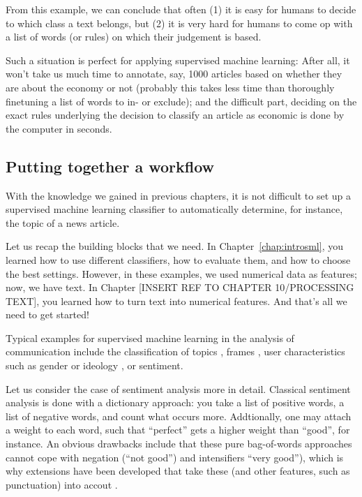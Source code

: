From this example, we can conclude that often (1) it is easy for
humans to decide to which class a text belongs, but (2) it is very
hard for humans to come op with a list of words (or rules) on which
their judgement is based.

Such a situation is perfect for applying supervised machine
learning: After all, it won't take us much time to annotate, say, 1000
articles based on whether they are about the economy or not (probably
this takes less time than thoroughly finetuning a list of words to in-
or exclude); and the difficult part, deciding on the exact rules
underlying the decision to classify an article as economic is done by
the computer in seconds.


\subsection{Putting together a workflow}
\label{sec:workflow}

With the knowledge we gained in previous chapters, it is not difficult
to set up a supervised machine learning classifier to automatically
determine, for instance, the topic of a news article.

Let us recap the building blocks that we need. In
Chapter~\ref{chap:introsml}, you learned how to use different
classifiers, how to evaluate them, and how to choose the best
settings. However, in these examples, we used numerical data as
features; now, we have text.  In Chapter [INSERT REF TO CHAPTER
  10/PROCESSING TEXT], you learned how to turn text into numerical
features. And that's all we need to get started!

Typical examples for supervised machine learning in the analysis of
communication include the classification of topics
\citep[e.g.,][]{Scharkow2011}, frames \citep[e.g.,][]{Burscher2014},
user characteristics such as gender or ideology ,
or sentiment.

Let us consider the case of sentiment analysis more in
detail. Classical sentiment analysis is done with a dictionary
approach: you take a list of positive words, a list of negative words,
and count what occurs more. Addtionally, one may attach a weight to
each word, such that ``perfect'' gets a higher weight than ``good'',
for instance.  An obvious drawbacks include that these pure
bag-of-words approaches cannot cope with negation (``not good'') and
intensifiers ``very good''), which is why extensions have been
developed that take these (and other features, such as punctuation)
into accout \citep{Thelwall2012,Hutto2014,DeSmedt2012}.


